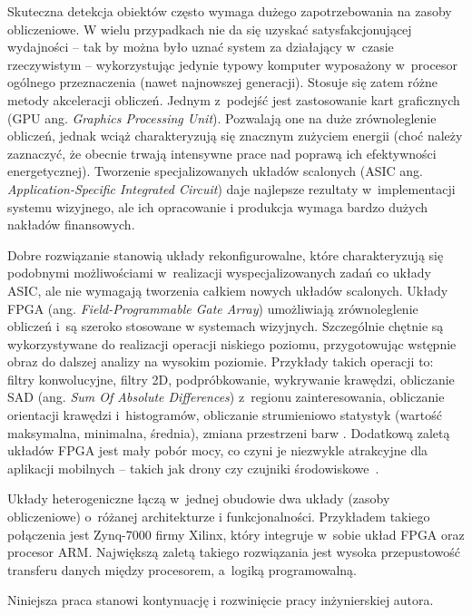 Skuteczna detekcja obiektów często wymaga dużego zapotrzebowania na zasoby obliczeniowe.
W wielu przypadkach nie da się uzyskać satysfakcjonującej wydajności -- tak by można było uznać system za działający w~czasie rzeczywistym -- wykorzystując jedynie typowy komputer wyposażony w~procesor ogólnego przeznaczenia (nawet najnowszej generacji).
Stosuje się zatem różne metody akceleracji obliczeń.
Jednym z~podejść jest zastosowanie kart graficznych (GPU ang. \textit{Graphics Processing Unit}).
Pozwalają one na duże zrównoleglenie obliczeń, jednak wciąż charakteryzują się znacznym zużyciem energii (choć należy zaznaczyć, że obecnie trwają intensywne prace nad poprawą ich efektywności energetycznej). 
Tworzenie specjalizowanych układów scalonych (ASIC ang. \textit{Application-Specific Integrated Circuit}) daje najlepsze rezultaty w~implementacji systemu wizyjnego, ale ich opracowanie i produkcja wymaga bardzo dużych nakładów finansowych. 

Dobre rozwiązanie stanowią układy rekonfigurowalne, które charakteryzują się podobnymi możliwościami w~realizacji wyspecjalizowanych zadań co układy ASIC, ale nie wymagają tworzenia całkiem nowych układów scalonych. 
Układy FPGA (ang. \textit{Field-Programmable Gate Array}) umożliwiają zrównoleglenie obliczeń i~są szeroko stosowane w systemach wizyjnych.
Szczególnie chętnie są wykorzystywane do realizacji operacji niskiego poziomu, przygotowując wstępnie obraz do dalszej analizy na wysokim poziomie.
Przykłady takich operacji to: filtry konwolucyjne, filtry 2D, podpróbkowanie, wykrywanie krawędzi, obliczanie SAD (ang. \textit{Sum Of Absolute Differences}) z~regionu zainteresowania, obliczanie orientacji krawędzi i~histogramów, obliczanie strumieniowo statystyk (wartość maksymalna, minimalna, średnia), zmiana przestrzeni barw \cite{kisacanin2008embedded}. 
Dodatkową zaletą układów FPGA jest mały pobór mocy, co czyni je niezwykle atrakcyjne dla aplikacji mobilnych -- takich jak drony czy czujniki środowiskowe~\cite{garcia2014survey}.

Układy heterogeniczne łączą w~jednej obudowie dwa układy (zasoby obliczeniowe) o~różanej architekturze i funkcjonalności.
Przykładem takiego połączenia jest Zynq-7000 firmy Xilinx, który integruje w~sobie układ FPGA oraz procesor ARM.
Największą zaletą takiego rozwiązania jest wysoka przepustowość transferu danych między procesorem, a~logiką programowalną.

Niniejsza praca stanowi kontynuację i rozwinięcie pracy inżynierskiej autora.

